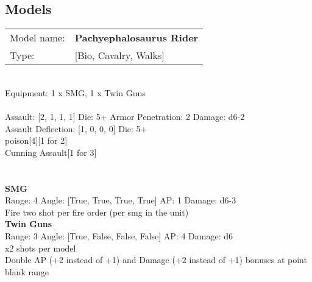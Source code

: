 \pagebreak

\subsection{ Models }

\begin{tabular}{ll}
Model name: & {\bf Pachyephalosaurus Rider } \\
Type: & [Bio, Cavalry, Walks] \\
\end{tabular}
\ \\
Equipment: 1 x SMG, 1 x Twin Guns \\
\ \\
Assault: [2, 1, 1, 1] Die: 5+ Armor Penetration: 2 Damage: d6-2 \\
Assault Deflection: [1, 0, 0, 0] Die: 5+\\
\indent poison[4][1 for 2]\\ 
Cunning Assault[1 for 3]\\ 
 
\ \\

\ \\
{\bf SMG } \\



Range: 4  Angle: [True, True, True, True] AP: 1 Damage: d6-3 \\
Fire two shot per fire order (per smg in the unit)\\ 




{\bf Twin Guns } \\



Range: 3  Angle: [True, False, False, False] AP: 4 Damage: d6 \\
x2 shots per model\\ 
Double AP (+2 instead of +1) and Damage (+2 instead of +1) bonuses at point blank range\\ 




 
\ \\














\pagebreak\clearpage

